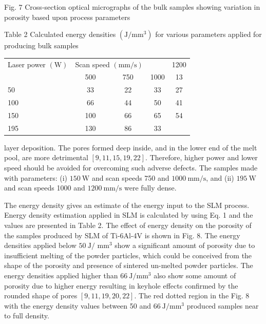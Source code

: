 \documentclass[10pt]{article}
\begin{document}
Fig. 7 Cross-section optical micrographs of the bulk samples showing variation in porosity based upon process parameters

Table 2 Calculated energy densities $\left(\mathrm{J} / \mathrm{mm}^{3}\right)$ for various parameters applied for producing bulk samples

\begin{center}
\begin{tabular}{lcccc}
\hline
Laser power $(\mathrm{W})$ & \multicolumn{2}{l}{Scan speed $(\mathrm{mm} / \mathrm{s})$} &  & 1200 \\
\cline { 2 - 5 }
 & 500 & 750 & 1000 & 13 \\
\hline
50 & 33 & 22 & 33 & 27 \\
100 & 66 & 44 & 50 & 41 \\
150 & 100 & 66 & 65 & 54 \\
195 & 130 & 86 & 33 &  \\
\hline
\end{tabular}
\end{center}

layer deposition. The pores formed deep inside, and in the lower end of the melt pool, are more detrimental $[9,11,15,19,22]$. Therefore, higher power and lower speed should be avoided for overcoming such adverse defects. The samples made with parameters: (i) $150 \mathrm{~W}$ and scan speeds 750 and $1000 \mathrm{~mm} / \mathrm{s}$, and (ii) $195 \mathrm{~W}$ and scan speeds 1000 and $1200 \mathrm{~mm} / \mathrm{s}$ were fully dense.

The energy density gives an estimate of the energy input to the SLM process. Energy density estimation applied in SLM is calculated by using Eq. 1 and the values are presented in Table 2. The effect of energy density on the porosity of the samples produced by SLM of Ti-6Al-4V is shown in Fig. 8. The energy densities applied below $50 \mathrm{~J} /$ $\mathrm{mm}^{3}$ show a significant amount of porosity due to insufficient melting of the powder particles, which could be conceived from the shape of the porosity and presence of sintered un-melted powder particles. The energy densities applied higher than $66 \mathrm{~J} / \mathrm{mm}^{3}$ also show some amount of porosity due to higher energy resulting in keyhole effects confirmed by the rounded shape of pores $[9,11,19,20,22]$. The red dotted region in the Fig. 8 with the energy density values between 50 and $66 \mathrm{~J} / \mathrm{mm}^{3}$ produced samples near to full density.
\end{document}
